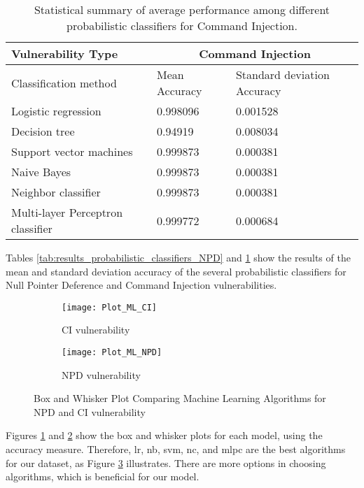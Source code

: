 \begin{table}[!ht]
    \centering
    \caption{Statistical summary of average performance among different probabilistic classifiers for Command Injection.}
    \begin{tabular}{|l|l|l|}
    \hline
        \textbf{Vulnerability Type} & \multicolumn{2}{|c|}{\textbf{Command Injection}} \\ \hline
        Classification method &  Mean Accuracy & Standard deviation Accuracy \\ \hline
        Logistic regression & 0.998096 & 0.001528 \\ \hline
        Decision tree & 0.94919 & 0.008034 \\ \hline
        Support vector machines & 0.999873 & 0.000381 \\ \hline
        Naive Bayes & 0.999873 & 0.000381 \\ \hline
        Neighbor classifier & 0.999873 & 0.000381 \\ \hline
        Multi-layer Perceptron classifier & 0.999772 & 0.000684 \\ \hline
    \end{tabular}
	\label{tab:results_probabilistic_classifiers_CI}
\end{table}

Tables \ref{tab:results_probabilistic_classifiers_NPD}  and \ref{tab:results_probabilistic_classifiers_CI} show the results of the mean and standard deviation accuracy of the several probabilistic classifiers for Null Pointer Deference and Command Injection vulnerabilities.

\begin{figure}
  \centering
  \begin{subfigure}{\textwidth}
    \centering
    \texttt{[image: Plot\_ML\_CI]}
    \caption{CI vulnerability}
    \label{fig:Plot_ML_CI_FIG}
  \end{subfigure}
  \hfill
  \begin{subfigure}{\textwidth}
    \centering
    \texttt{[image: Plot\_ML\_NPD]}
    \caption{NPD vulnerability}
     \label{fig:Plot_ML_CI_NPD}
  \end{subfigure}
  \caption{Box and Whisker Plot Comparing Machine Learning Algorithms for NPD and CI vulnerability}
   \label{fig:Plot_ML_BOX_FIG}
\end{figure}

Figures \ref{fig:Plot_ML_CI_FIG} and \ref{fig:Plot_ML_CI_NPD} show the box and whisker plots for each model, using the accuracy measure. Therefore, \gls{lr}, \gls{nb}, \gls{svm}, \gls{nc}, and \gls{mlpc} are the best algorithms for our dataset, as Figure \ref{fig:Plot_ML_BOX_FIG} illustrates. There are more options in choosing algorithms, which is beneficial for our model.

